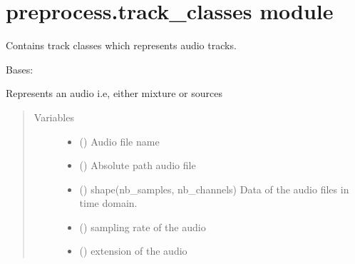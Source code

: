 \documentclass[letterpaper,10pt,english,openany,oneside]{sphinxmanual}
\begin{document}
\section{preprocess.track\_classes module}
\label{\detokenize{docs/source/preprocess:module-preprocess.track_classes}}\label{\detokenize{docs/source/preprocess:preprocess-track-classes-module}}
Contains track classes which represents audio tracks.

\begin{fulllineitems}
\label{\detokenize{docs/source/preprocess:preprocess.track_classes.Audio}}
Bases: 

Represents an audio i.e, either mixture or sources
\begin{quote}\begin{description}
\item[{Variables}] \leavevmode\begin{itemize}
\item {} 
 () \textendash{} Audio file name

\item {} 
 () \textendash{} Absolute path audio file

\item {} 
 () \textendash{} shape(nb\_samples, nb\_channels)
Data of the audio files in time domain.

\item {} 
 () \textendash{} sampling rate of the audio

\item {} 
 () \textendash{} extension of the audio

\end{itemize}


\end{description}
\end{quote}
\end{fulllineitems}
\end{document}
